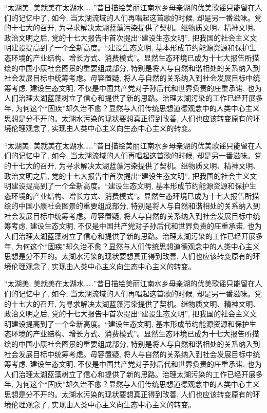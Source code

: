 \documentclass[shorttitle,oneside]{NJUbachelor}
\begin{document}
“太湖美, 美就美在太湖水……”昔日描绘美丽江南水乡母亲湖的优美歌谣只能留在人们的记忆中了, 如今, 当太湖流域的人们再唱起这首歌的时候, 却是另一番滋味。党的十七大的召开, 为寻求解决太湖蓝藻污染提供了契机。继物质文明、精神文明、政治文明之后, 党的十七大报告中首次提出“建设生态文明”, 把我国的社会主义文明建设提高到了一个全新高度。“建设生态文明, 基本形成节约能源资源和保护生态环境的产业结构、增长方式、消费模式”。显然生态环境已成为十七大报告所描绘的中国小康社会图景的重要组成部分, 特别是将人与自然和谐相处的关系纳入到社会发展目标中统筹考虑。毋容置疑, 将人与自然的关系纳入到社会发展目标中统筹考虑, 建设生态文明, 不仅是中国共产党对子孙后代和世界负责的庄重承诺, 也为人们治理太湖蓝藻树立了信心和提供了新的思路。治理太湖污染的工作已经开展多年, 为何这个“固疾”却久治不愈？显然与人们传统思想道德观念中的人类中心主义思想是分不开的。太湖水污染的现状要想真正得到改善, 人们也应该转变原有的环境伦理观念了, 实现由人类中心主义向生态中心主义的转变。

“太湖美, 美就美在太湖水……”昔日描绘美丽江南水乡母亲湖的优美歌谣只能留在人们的记忆中了, 如今, 当太湖流域的人们再唱起这首歌的时候, 却是另一番滋味。党的十七大的召开, 为寻求解决太湖蓝藻污染提供了契机。继物质文明、精神文明、政治文明之后, 党的十七大报告中首次提出“建设生态文明”, 把我国的社会主义文明建设提高到了一个全新高度。“建设生态文明, 基本形成节约能源资源和保护生态环境的产业结构、增长方式、消费模式”。显然生态环境已成为十七大报告所描绘的中国小康社会图景的重要组成部分, 特别是将人与自然和谐相处的关系纳入到社会发展目标中统筹考虑。毋容置疑, 将人与自然的关系纳入到社会发展目标中统筹考虑, 建设生态文明, 不仅是中国共产党对子孙后代和世界负责的庄重承诺, 也为人们治理太湖蓝藻树立了信心和提供了新的思路。治理太湖污染的工作已经开展多年, 为何这个“固疾”却久治不愈？显然与人们传统思想道德观念中的人类中心主义思想是分不开的。太湖水污染的现状要想真正得到改善, 人们也应该转变原有的环境伦理观念了, 实现由人类中心主义向生态中心主义的转变。

“太湖美, 美就美在太湖水……”昔日描绘美丽江南水乡母亲湖的优美歌谣只能留在人们的记忆中了, 如今, 当太湖流域的人们再唱起这首歌的时候, 却是另一番滋味。党的十七大的召开, 为寻求解决太湖蓝藻污染提供了契机。继物质文明、精神文明、政治文明之后, 党的十七大报告中首次提出“建设生态文明”, 把我国的社会主义文明建设提高到了一个全新高度。“建设生态文明, 基本形成节约能源资源和保护生态环境的产业结构、增长方式、消费模式”。显然生态环境已成为十七大报告所描绘的中国小康社会图景的重要组成部分, 特别是将人与自然和谐相处的关系纳入到社会发展目标中统筹考虑。毋容置疑, 将人与自然的关系纳入到社会发展目标中统筹考虑, 建设生态文明, 不仅是中国共产党对子孙后代和世界负责的庄重承诺, 也为人们治理太湖蓝藻树立了信心和提供了新的思路。治理太湖污染的工作已经开展多年, 为何这个“固疾”却久治不愈？显然与人们传统思想道德观念中的人类中心主义思想是分不开的。太湖水污染的现状要想真正得到改善, 人们也应该转变原有的环境伦理观念了, 实现由人类中心主义向生态中心主义的转变。
\end{document}
